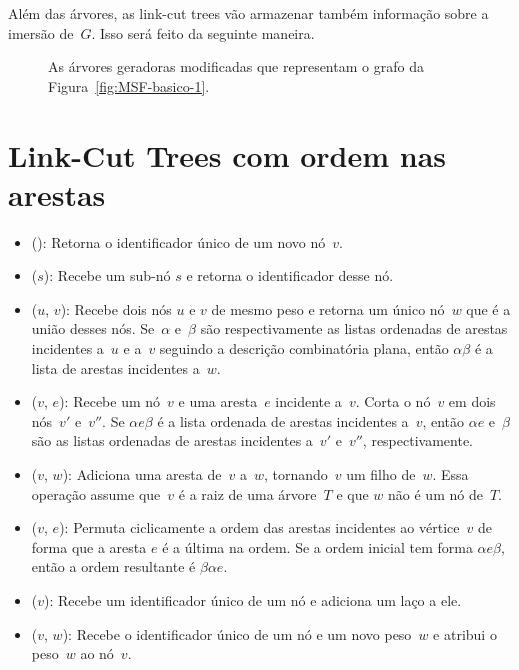 Além das árvores, as link-cut trees vão armazenar também informação sobre a imersão de~$G$.
Isso será feito da seguinte maneira.


\begin{figure}[htb]
\centering

\caption{As árvores geradoras modificadas que representam o grafo da Figura~\ref{fig:MSF-basico-1}.}
\label{fig:MSF-figura-3}
\end{figure}



\section{Link-Cut Trees com ordem nas arestas}


\begin{itemize}
\item \LCOMakeNode(): Retorna o identificador único de um novo nó~$v$.
\item \LCOFindNode($s$): Recebe um sub-nó $s$ e retorna o identificador desse nó.
\item \LCOMerge($u$, $v$): Recebe dois nós $u$ e $v$ de mesmo peso e retorna um único nó~$w$ que é a união desses nós.
Se~$\alpha$ e~$\beta$ são respectivamente as listas ordenadas de arestas incidentes a~$u$ e a~$v$ seguindo a descrição combinatória plana, então $\alpha\beta$ é a lista de arestas incidentes a~$w$.
\item \LCOSplit($v$, $e$): Recebe um nó~$v$ e uma aresta~$e$ incidente a~$v$.
Corta o nó~$v$ em dois nós~$v'$ e~$v''$. Se $\alpha e\beta$ é a lista ordenada de arestas incidentes a~$v$, então $\alpha e$ e~$\beta$ são as listas ordenadas de arestas incidentes a~$v'$ e~$v''$, respectivamente.
\item \LCOLink($v$, $w$): Adiciona uma aresta de~$v$ a~$w$, tornando~$v$ um filho de~$w$. Essa operação assume que~$v$ é a raiz de uma árvore~$T$ e que $w$ não é um nó de~$T$.
\item \LCOCycle($v$, $e$): Permuta ciclicamente a ordem das arestas incidentes ao vértice~$v$ de forma que a aresta $e$ é a última na ordem. Se a ordem inicial tem forma $\alpha e \beta$, então a ordem resultante é $\beta\alpha e$.
\item \LCOLoop($v$): Recebe um identificador único de um nó e adiciona um laço a ele.
\item \LCOAddCost($v$, $w$): Recebe o identificador único de um nó e um novo peso~$w$ e atribui o peso~$w$ ao nó~$v$.
\end{itemize}

